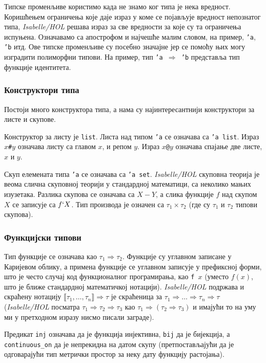Типске променљиве користимо када не знамо ког типа је нека
вредност. Коришћењем ограничења које даје израз у коме се појављује
вредност непознатог типа, \emph{Isabelle/HOL} решава израз за све
вредности за које су та ограничења испуњена. Означавамо са апострофом
и најчешће малим словом, на пример, {\tt 'a}, {\tt 'b} итд. Ове типске
променљиве су посебно значајне јер се помоћу њих могу изградити
полиморфни типови. На пример, тип {\tt 'a $\Rightarrow$ 'b} представља
тип функције идентитета.

\subsubsection{Конструктори типа}

Постоји много конструктора типа, а нама су најинтересантнији
конструктори за листе и скупове.

Конструктор за листу је {\tt list}. Листа над типом {\tt 'a} се
означава са {\tt 'a list}. Израз $x${\tt \#}$y$ означава листу са главом $x$,
и репом $y$. Израз $x${\tt @}$y$ означава спајање две листе, $x$ и $y$.

Скуп елемената типа {\tt 'a} се означава са {\tt 'a
  set}. \emph{Isabelle/HOL} скуповна теорија је веома слична скуповној
теорији у стандардној математици, са неколико мањих изузетака. Разлика
скупова се означава са $X - Y$, а слика функције $f$ над скупом $X$ се
записује са $f ` X$. Тип производа је означен са $\tau_1 \times
\tau_2$ (где су $\tau_1$ и $\tau_2$ типови скупова).


\subsubsection{Функцијски типови}

Тип функције се означава као $\tau_1 \Rightarrow \tau_2$. Функције су
углавном записане у Каријевом облику, а примена функције се углавном
записује у префиксној форми, што је често случај код функционалног
програмирања, као {\tt f $x$} (уместо $f(x)$, што је ближе стандардној
математичкој нотацији).  \emph{Isabelle/HOL} подржава и скраћену
нотацију $\llbracket \tau_1, \ldots, \tau_n \rrbracket \Rightarrow
\tau$ је скраћеница за $\tau_1 \Rightarrow \ldots \Rightarrow \tau_n
\Rightarrow \tau$ (\emph{Isabelle/HOL} посматра $\tau_1 \Rightarrow
\tau_2 \Rightarrow \tau_3$ као $\tau_1 \Rightarrow (\tau_2 \Rightarrow
\tau_3)$ и имајући то на уму ми у претходном изразу нисмо писали
заграде).

Предикат {\tt inj} означава да је функција инјективна, {\tt bij} да је
бијекција, а {\tt continuous\_on} да је непрекидна на датом скупу
(претпостављајући да је одговарајући тип метрички простор за неку дату
функцију растојања).

